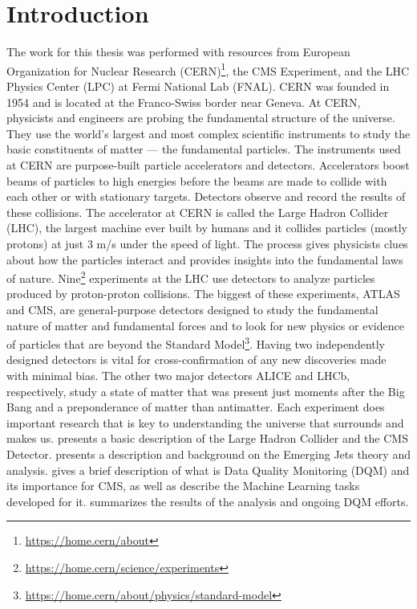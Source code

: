 \chapter{Introduction}

The work for this thesis was performed with resources from European Organization for Nuclear Research (CERN)\footnote{\url{https://home.cern/about}}, the CMS Experiment\cite{CMS_detector}, and the LHC Physics Center (LPC) at Fermi National Lab (FNAL).
CERN was founded in 1954 and is located at the Franco-Swiss border near Geneva. At CERN, physicists and engineers are probing the fundamental structure of the universe. They use the world's largest and most complex scientific instruments to study the basic constituents of matter --- the fundamental particles.
The instruments used at CERN are purpose-built particle accelerators and detectors. Accelerators boost beams of particles to high energies before the beams are made to collide with each other or with stationary targets. Detectors observe and record the results of these collisions. The accelerator at CERN is called the Large Hadron Collider (LHC), the largest machine ever built by humans and it collides particles (mostly protons) at just
3 m/s under the speed of light.
The process gives physicists clues about how the particles interact and provides insights into the fundamental laws of nature. Nine\footnote{\url{https://home.cern/science/experiments}} experiments at the LHC use detectors to analyze particles produced by proton-proton collisions.
The biggest of these experiments, ATLAS and CMS, are general-purpose detectors designed to study the
fundamental nature of matter and fundamental forces and to look for new physics or evidence of particles that are beyond the Standard Model\footnote{\url{https://home.cern/about/physics/standard-model}}. Having two independently designed detectors is vital for cross-confirmation of any new discoveries made with minimal bias. The other two major detectors ALICE and LHCb, respectively, study a state of matter that was present just moments after the Big Bang and a preponderance of matter than antimatter.  Each experiment does important research that is key to understanding the universe that surrounds and makes us.
 presents a basic description of the Large Hadron Collider and the CMS Detector.
 presents a description and background on the Emerging Jets theory and analysis.
 gives a brief description of what is Data Quality Monitoring (DQM) and its importance for CMS, as well as describe the Machine Learning tasks developed for it.
 summarizes the results of the analysis and ongoing DQM efforts.
